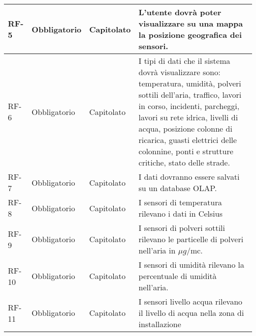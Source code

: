 \begin{longtable}{|>{\centering\arraybackslash}m{}|>{\centering\arraybackslash}m{}|>{\centering\arraybackslash}m{}|>{\centering\arraybackslash}m{}|}
	RF-5            & Obbligatorio        & Capitolato     & L'utente dovrà poter visualizzare su una mappa la posizione geografica dei sensori.                                                                                                                                                                                                                                \\\hline
	RF-6            & Obbligatorio        & Capitolato     & I tipi di dati che il sistema dovrà visualizzare sono: temperatura, umidità, polveri sottili dell’aria, traffico, lavori in corso, incidenti, parcheggi, lavori su rete idrica, livelli di acqua, posizione colonne di ricarica, guasti elettrici delle colonnine, ponti e strutture critiche, stato delle strade. \\\hline
	RF-7            & Obbligatorio        & Capitolato     & I dati dovranno essere salvati su un database OLAP.                                                                                                                                                                                                                                                                \\\hline
	RF-8            & Obbligatorio        & Capitolato     & I sensori di temperatura rilevano i dati in Celsius                                                                                                                                                                                                                                                                \\\hline
	RF-9            & Obbligatorio        & Capitolato     & I sensori di polveri sottili rilevano le particelle di polveri nell’aria in $\mu g$/mc.                                                                                                                                                                                                                            \\\hline
	RF-10           & Obbligatorio        & Capitolato     & I sensori di umidità rilevano la percentuale di umidità nell’aria.                                                                                                                                                                                                                                                 \\\hline
	RF-11           & Obbligatorio        & Capitolato     & I sensori livello acqua rilevano il livello di acqua nella zona di installazione                                                                                                                                                                                                                                   \\\hline

\end{longtable}
